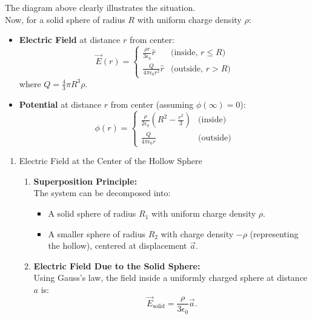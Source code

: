 \documentclass[a4paper]{article}
\begin{document}
\begin{tcolorbox}[
    title=Solution,
    colback=white,
    colframe=myblue,
    coltitle=black,
    fonttitle=\bfseries\large,
    breakable,
    enhanced,
    attach boxed title to top center={yshift=-2mm},
    boxed title style={colback=myblue!20, colframe=myblue}
]
The diagram above clearly illustrates the situation. \\ 
Now, for a solid sphere of radius \( R \) with uniform charge density \( \rho \):

\begin{itemize}
    \item \textbf{Electric Field} at distance \( r \) from center:
    \[
    \vec{E}(r) = \begin{cases}
        \frac{\rho r}{3\epsilon_0}  \hat{r} & \text{(inside, } r \leq R) \\
        \frac{Q}{4\pi\epsilon_0 r^2} \hat{r} & \text{(outside, } r > R)
    \end{cases}
    \]
    where \( Q = \frac{4}{3}\pi R^3 \rho \).

    \item \textbf{Potential} at distance \( r \) from center (assuming \( \phi(\infty) = 0 \)):
    \[
    \phi(r) = \begin{cases}
        \frac{\rho}{2\epsilon_0} \left( R^2 - \frac{r^2}{3} \right) & \text{(inside)} \\
        \frac{Q}{4\pi\epsilon_0 r} & \text{(outside)}
    \end{cases}
    \]
\end{itemize}
\begin{enumerate}[label=\alph*)]
\item Electric Field at the Center of the Hollow Sphere
\begin{enumerate}
    \item \textbf{Superposition Principle:} \\
    The system can be decomposed into:
    \begin{itemize}
        \item A solid sphere of radius \( R_1 \) with uniform charge density \( \rho \).
        \item A smaller sphere of radius \( R_2 \) with charge density \( -\rho \) (representing the hollow), centered at displacement \( \vec{a} \).
    \end{itemize}

    \item \textbf{Electric Field Due to the Solid Sphere:} \\
    Using Gauss's law, the field inside a uniformly charged sphere at distance \( a \) is:
    \[
    \vec{E}_{\text{solid}} = \frac{\rho}{3\epsilon_0} \vec{a}.
    \]


\end{enumerate}
\end{enumerate}
\end{tcolorbox}
\end{document}
